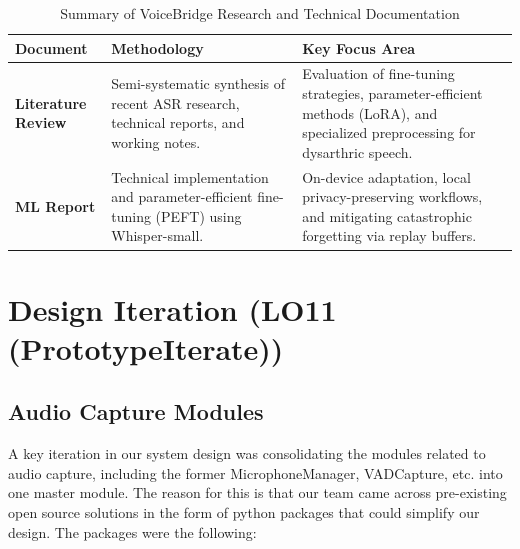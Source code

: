 \documentclass{article}
\begin{document}
\begin{table}[H]
\centering
\renewcommand{\arraystretch}{1.5}
\begin{tabularx}{\textwidth}{l p{4.5cm} X}
\hline
\textbf{Document} & \textbf{Methodology} & \textbf{Key Focus Area} \\ \hline
\textbf{Literature Review} & Semi-systematic synthesis of recent ASR research, technical reports, and working notes. & Evaluation of fine-tuning strategies, parameter-efficient methods (LoRA), and specialized preprocessing for dysarthric speech. \\
\textbf{ML Report} & Technical implementation and parameter-efficient fine-tuning (PEFT) using Whisper-small. & On-device adaptation, local privacy-preserving workflows, and mitigating catastrophic forgetting via replay buffers. \\ \hline
\end{tabularx}
\caption{Summary of VoiceBridge Research and Technical Documentation}
\label{tab:doc_summary}
\end{table}

\section{Design Iteration (LO11 (PrototypeIterate))}


\subsection{Audio Capture Modules}
A key iteration in our system design was consolidating the modules related to audio capture, including the former MicrophoneManager, VADCapture, etc. into one master module. The reason for this is that our team came across pre-existing open source solutions in the form of python packages that could simplify our design. The packages were the following:
\end{document}
